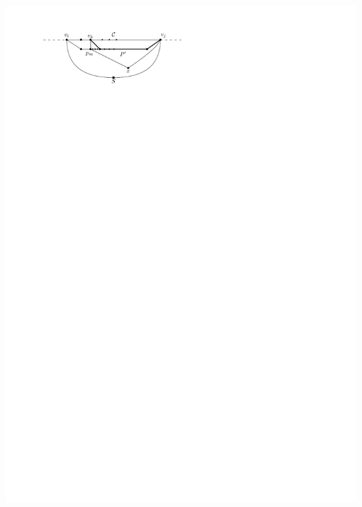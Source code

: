 \documentclass[a4paper]{article}
\begin{document}
\includegraphics[scale=1]{unifiedAlgo/img/sweep/cases/pEBound}
\clearpage%
\end{document}
